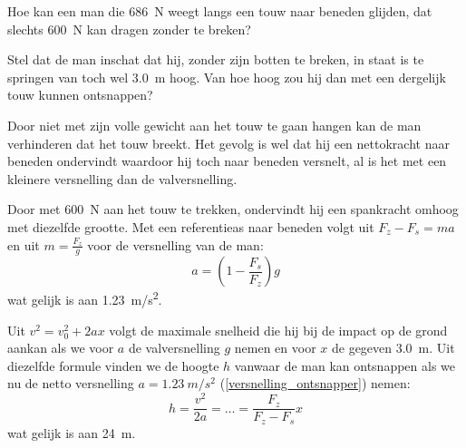 


\item{}Hoe kan een man die \SI{686}{N} weegt langs een touw naar beneden glijden, dat slechts \SI{600}{N} kan dragen zonder te breken?

Stel dat de man inschat dat hij, zonder zijn botten te breken, in staat is te springen van toch wel \SI{3,0}{m} hoog. Van hoe hoog zou hij dan met een dergelijk touw kunnen ontsnappen?



\begin{oplossing}
Door niet met zijn volle gewicht aan het touw te gaan hangen kan de man verhinderen dat het touw breekt. Het gevolg is wel dat hij een nettokracht naar beneden ondervindt waardoor hij toch naar beneden versnelt, al is het met een kleinere versnelling dan de valversnelling.

Door met \SI{600}{N} aan het touw te trekken, ondervindt hij een spankracht omhoog met diezelfde grootte. Met een referentieas naar beneden volgt uit $F_z-F_s=ma$ en uit $m=\frac{F_z}{g}$ voor de versnelling van de man:
\begin{equation}
	a=\left(1-\frac{F_s}{F_z}\right)g\label{versnelling_ontsnapper}
\end{equation}
wat gelijk is aan \SI{1,23}{m/s^2}.

Uit $v^2=v_0^2+2ax$ volgt de maximale snelheid die hij bij de impact op de grond aankan als we voor $a$ de valversnelling $g$ nemen en voor $x$ de gegeven \SI{3,0}{m}. Uit diezelfde formule vinden we de hoogte $h$ vanwaar de man kan ontsnappen als we nu de netto versnelling $a=\SI{1,23}{m/s^2}$ (\ref{versnelling_ontsnapper}) nemen: 
\begin{equation*}
	h=\frac{v^2}{2a}=\ldots=\frac{F_z}{F_z-F_s}x
\end{equation*}
wat gelijk is aan \SI{24}{m}.
\end{oplossing}